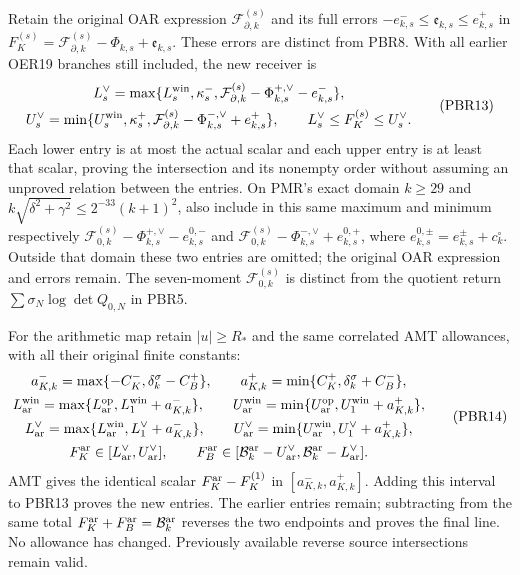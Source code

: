 \documentclass[11pt,a4paper]{article}
\begin{document}
Retain the original OAR expression $\mathcal F_{\partial,k}^{(s)}$
and its full errors
$-e_{k,s}^-\le\mathfrak e_{k,s}\le e_{k,s}^+$ in
$F_K^{(s)}=\mathcal F_{\partial,k}^{(s)}-\Phi_{k,s}
+\mathfrak e_{k,s}$. These errors are distinct from PBR8.
With all earlier OER19 branches still included, the new receiver is
\[
\begin{gathered}
 L_s^\vee=\max\{L_s^{\rm win},\kappa_s^-,
  \mathcal F_{\partial,k}^{(s)}-\Phi_{k,s}^{+,\vee}-e_{k,s}^-\},\\
 U_s^\vee=\min\{U_s^{\rm win},\kappa_s^+,
  \mathcal F_{\partial,k}^{(s)}-\Phi_{k,s}^{-,\vee}+e_{k,s}^+\},
 \qquad L_s^\vee\le F_K^{(s)}\le U_s^\vee .
\end{gathered}\tag{PBR13}
\]
Each lower entry is at most the actual scalar and each upper entry
is at least that scalar, proving the intersection and its nonempty
order without assuming an unproved relation between the entries.
On PMR's exact domain
$k\ge29$ and $k\sqrt{\delta^2+\gamma^2}\le2^{-33}(k+1)^2$,
also include in this same maximum and minimum respectively
$\mathcal F_{0,k}^{(s)}-\Phi_{k,s}^{+,\vee}-e_{k,s}^{0,-}$
and $\mathcal F_{0,k}^{(s)}-\Phi_{k,s}^{-,\vee}+e_{k,s}^{0,+}$,
where $e_{k,s}^{0,\pm}=e_{k,s}^{\pm}+c_k^\circ$.
Outside that domain these two entries are omitted; the original
OAR expression and errors remain. The seven-moment
$\mathcal F_{0,k}^{(s)}$ is distinct from the quotient return
$\sum\sigma_N\log\det Q_{0,N}$ in PBR5.

For the arithmetic map retain $|u|\ge R_*$ and the same correlated
AMT allowances, with all their original finite constants:
\[
\begin{gathered}
 a_{K,k}^-=\max\{-C_K^-,\delta_k^\sigma-C_B^+\},\qquad
 a_{K,k}^+=\min\{C_K^+,\delta_k^\sigma+C_B^-\},\\
 L_{\rm ar}^{\rm win}
 =\max\{L_{\rm ar}^{\rm op},L_1^{\rm win}+a_{K,k}^-\},\qquad
 U_{\rm ar}^{\rm win}
 =\min\{U_{\rm ar}^{\rm op},U_1^{\rm win}+a_{K,k}^+\},\\
 L_{\rm ar}^{\vee}
 =\max\{L_{\rm ar}^{\rm win},L_1^\vee+a_{K,k}^-\},\qquad
 U_{\rm ar}^{\vee}
 =\min\{U_{\rm ar}^{\rm win},U_1^\vee+a_{K,k}^+\},\\
 F_K^{\rm ar}\in[L_{\rm ar}^{\vee},U_{\rm ar}^{\vee}],\qquad
 F_B^{\rm ar}\in[\mathcal B_k^{\rm ar}-U_{\rm ar}^{\vee},
                  \mathcal B_k^{\rm ar}-L_{\rm ar}^{\vee}].
\end{gathered}\tag{PBR14}
\]
AMT gives the identical scalar
$F_K^{\rm ar}-F_K^{(1)}$ in $[a_{K,k}^-,a_{K,k}^+]$.
Adding this interval to PBR13 proves the new entries. The earlier
entries remain; subtracting from the same total
$F_K^{\rm ar}+F_B^{\rm ar}=\mathcal B_k^{\rm ar}$ reverses the
two endpoints and proves the final line. No allowance has changed.
Previously available reverse source intersections remain valid.
\end{document}
